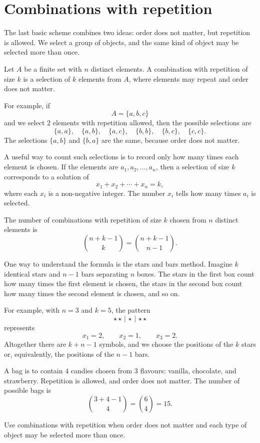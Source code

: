 \section{Combinations with repetition}

The last basic scheme combines two ideas: order does not matter, but repetition is allowed. We select a group of objects, and the same kind of object may be selected more than once.

\begin{definitionbox}
Let \(A\) be a finite set with \(n\) distinct elements. A combination with repetition of size \(k\) is a selection of \(k\) elements from \(A\), where elements may repeat and order does not matter.
\end{definitionbox}

For example, if
\[
A=\{a,b,c\}
\]
and we select \(2\) elements with repetition allowed, then the possible selections are
\[
\{a,a\},\quad \{a,b\},\quad \{a,c\},\quad \{b,b\},\quad \{b,c\},\quad \{c,c\}.
\]
The selections \(\{a,b\}\) and \(\{b,a\}\) are the same, because order does not matter.

A useful way to count such selections is to record only how many times each element is chosen. If the elements are \(a_1,a_2,\ldots,a_n\), then a selection of size \(k\) corresponds to a solution of
\[
x_1+x_2+\cdots+x_n=k,
\]
where each \(x_i\) is a non-negative integer. The number \(x_i\) tells how many times \(a_i\) is selected.

\begin{theorembox}
The number of combinations with repetition of size \(k\) chosen from \(n\) distinct elements is
\[
\binom{n+k-1}{k}=\binom{n+k-1}{n-1}.
\]
\end{theorembox}

One way to understand the formula is the stars and bars method. Imagine \(k\) identical stars and \(n-1\) bars separating \(n\) boxes. The stars in the first box count how many times the first element is chosen, the stars in the second box count how many times the second element is chosen, and so on.

For example, with \(n=3\) and \(k=5\), the pattern
\[
\star\star\,|\,\star\,|\,\star\star
\]
represents
\[
x_1=2,\qquad x_2=1,\qquad x_3=2.
\]
Altogether there are \(k+n-1\) symbols, and we choose the positions of the \(k\) stars or, equivalently, the positions of the \(n-1\) bars.

\begin{examplebox}
A bag is to contain \(4\) candies chosen from \(3\) flavours: vanilla, chocolate, and strawberry. Repetition is allowed, and order does not matter. The number of possible bags is
\[
\binom{3+4-1}{4}=\binom{6}{4}=15.
\]
\end{examplebox}

\begin{remarkbox}
Use combinations with repetition when order does not matter and each type of object may be selected more than once.
\end{remarkbox}
